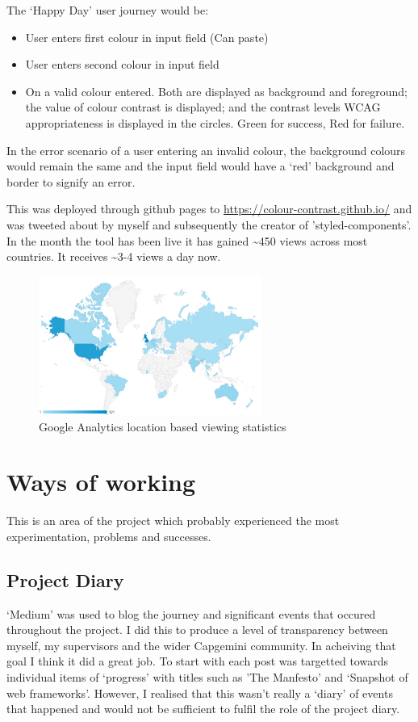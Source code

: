 The `Happy Day' user journey would be:
\begin{itemize}
\item User enters first colour in input field (Can paste)
\item User enters second colour in input field
\item On a valid colour entered. Both are displayed as background and
foreground; the value of colour contrast is displayed; and the contrast
levels WCAG appropriateness is displayed in the circles. Green for success, Red
for failure.
\end{itemize}

In the error scenario of a user entering an invalid colour, the background
colours would remain the same and the input field would have a `red'
background and border to signify an error.

This was deployed through github pages to \url{https://colour-contrast.github.io/}
and was tweeted about by myself and
subsequently the creator of 'styled-components'. In the month
the tool has been live it has gained \textasciitilde450 views across most
countries. It receives \textasciitilde3-4 views a day now.

\begin{figure}[H]
\centering
\includegraphics[width=0.65\textwidth]{figures/colour_contrast_analytics}
\captionsetup{justification=centering}
\caption{Google Analytics location based viewing statistics
\label{fig:colour_contrast_analytics}}
\end{figure}


\section{Ways of working}
This is an area of the project which probably experienced the most
experimentation, problems and successes.

\subsection{Project Diary}
`Medium' was used to blog the journey and significant events that
occured throughout the project. I did this to produce a level of transparency
between myself, my supervisors and the wider Capgemini community. In
acheiving that goal I think it did a great job. To start with each post was
targetted towards individual items of `progress' with titles such as 'The
Manfesto' and `Snapshot of web frameworks'. However, I realised that this
wasn't really a `diary' of events that happened and would not be sufficient
to fulfil the role of the project diary.

